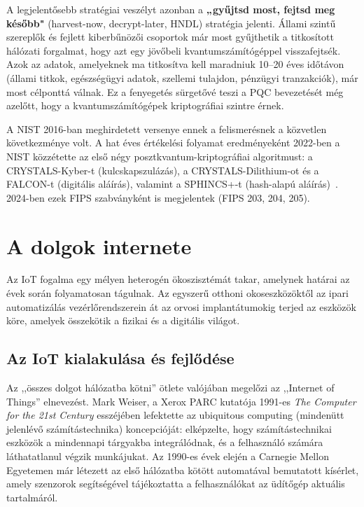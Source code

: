 A legjelentősebb stratégiai veszélyt azonban a \textbf{„gyűjtsd most, fejtsd meg később"}
(harvest-now, decrypt-later, HNDL) stratégia jelenti. Állami szintű szereplők és fejlett
kiberbűnözői csoportok már most gyűjthetik a titkosított hálózati forgalmat, hogy azt egy
jövőbeli kvantumszámítógéppel visszafejtsék. Azok az adatok, amelyeknek ma titkosítva kell
maradniuk 10--20 éves időtávon (állami titkok, egészségügyi adatok, szellemi tulajdon,
pénzügyi tranzakciók), már most célponttá válnak. Ez a fenyegetés sürgetővé teszi a PQC
bevezetését még azelőtt, hogy a kvantumszámítógépek kriptográfiai szintre érnek.

A NIST 2016-ban meghirdetett versenye ennek a felismerésnek a közvetlen következménye volt.
A hat éves értékelési folyamat eredményeként 2022-ben a NIST közzétette az első négy
posztkvantum-kriptográfiai algoritmust: a CRYSTALS-Kyber-t (kulcskapszulázás), a
CRYSTALS-Dilithium-ot és a FALCON-t (digitális aláírás), valamint a SPHINCS+-t (hash-alapú
aláírás)~\cite{NIST-Select-2022}. 2024-ben ezek FIPS szabványként is megjelentek (FIPS 203, 204, 205).


\section{A dolgok internete}

Az IoT fogalma egy mélyen heterogén ökoszisztémát takar, amelynek határai az évek során
folyamatosan tágulnak. Az egyszerű otthoni okoseszközöktől az ipari automatizálás
vezérlőrendszerein át az orvosi implantátumokig terjed az eszközök köre, amelyek összekötik a
fizikai és a digitális világot.

\subsection{Az IoT kialakulása és fejlődése}

Az ,,összes dolgot hálózatba kötni'' ötlete valójában megelőzi az ,,Internet of Things'' elnevezést.
Mark Weiser, a Xerox PARC kutatója 1991-es \textit{The Computer for the 21st Century} esszéjében
lefektette az ubiquitous computing (mindenütt jelenlévő számítástechnika) koncepcióját: elképzelte,
hogy számítástechnikai eszközök a mindennapi tárgyakba integrálódnak, és a felhasználó számára
láthatatlanul végzik munkájukat. Az 1990-es évek elején a Carnegie Mellon
Egyetemen már létezett az első hálózatba kötött automatával bemutatott kísérlet, amely szenzorok
segítségével tájékoztatta a felhasználókat az üdítőgép aktuális tartalmáról.

